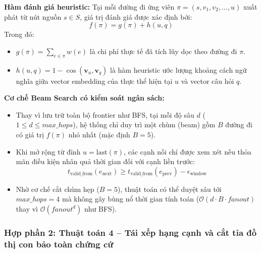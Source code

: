 \documentclass[a4paper,11pt]{article}
\begin{document}
\textbf{Hàm đánh giá heuristic:}
Tại mỗi đường đi ứng viên $\pi = (s, v_1, v_2, \dots, u)$ xuất phát từ nút nguồn $s \in S$, giá trị đánh giá được xác định bởi:
\begin{equation}
    f(\pi) = g(\pi) + h(u, q)
\end{equation}
Trong đó:
\begin{itemize}[noitemsep]
    \item $g(\pi) = \sum_{e \in \pi} w(e)$ là chi phí thực tế đã tích lũy dọc theo đường đi $\pi$.
    \item $h(u, q) = 1 - \cos(\mathbf{v}_u, \mathbf{v}_q)$ là hàm heuristic ước lượng khoảng cách ngữ nghĩa giữa vector embedding của thực thể hiện tại $u$ và vector câu hỏi $q$.
\end{itemize}

\textbf{Cơ chế Beam Search có kiểm soát ngân sách:}
\begin{itemize}[leftmargin=1.5em]
    \item Thay vì lưu trữ toàn bộ frontier như BFS, tại mỗi độ sâu $d$ ($1 \le d \le max\_hops$), hệ thống chỉ duy trì một chùm (beam) gồm $B$ đường đi có giá trị $f(\pi)$ nhỏ nhất (mặc định $B = 5$).
    \item Khi mở rộng từ đỉnh $u = \text{last}(\pi)$, các cạnh nối chỉ được xem xét nếu thỏa mãn điều kiện nhân quả thời gian đối với cạnh liền trước:
    \begin{equation}
        t_{\text{valid\_from}}(e_{\text{next}}) \ge t_{\text{valid\_from}}(e_{\text{prev}}) - \epsilon_{\text{window}}
    \end{equation}
    \item Nhờ cơ chế cắt chùm hẹp ($B=5$), thuật toán có thể duyệt sâu tới $max\_hops = 4$ mà không gây bùng nổ thời gian tính toán ($\mathcal{O}(d \cdot B \cdot fanout)$ thay vì $\mathcal{O}(fanout^d)$ như BFS).
\end{itemize}

\subsubsection{Hợp phần 2: Thuật toán 4 -- Tái xếp hạng cạnh và cắt tỉa đồ thị con bảo toàn chứng cứ}
\label{sec:algo-rerank-prune}
\end{document}

